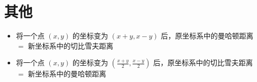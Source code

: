
\section{其他}
\begin{itemize}
\item 将一个点 $(x,y)$ 的坐标变为 $(x+y,x−y)$ 后，原坐标系中的曼哈顿距离 $=$ 新坐标系中的切比雪夫距离

\item 将一个点 $(x,y)$ 的坐标变为 $(\frac{x+y}{2},\frac{x−y}{2})$ 后，原坐标系中的切比雪夫距离 $=$ 新坐标系中的曼哈顿距离
\end{itemize}
